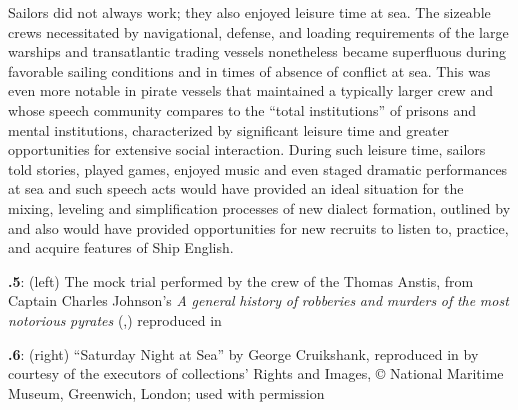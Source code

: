 Sailors did not always work; they also enjoyed leisure time at sea. The sizeable crews necessitated by navigational, defense, and loading requirements of the large warships and transatlantic trading vessels nonetheless became superfluous during favorable sailing conditions and in times of absence of conflict at sea. This was even more notable in pirate vessels that maintained a typically larger crew and whose speech community \citet{Burg2001} compares to the “total institutions” of prisons and mental institutions, characterized by significant leisure time and greater opportunities for extensive social interaction. During such leisure time, sailors told stories, played games, enjoyed music and even staged dramatic performances at sea \citep[155]{Rediker2004} and such speech acts would have provided an ideal situation for the mixing, leveling and simplification processes of new dialect formation, outlined by \citet{Trudgill1986} and also would have provided opportunities for new recruits to listen to, practice, and acquire features of Ship English.

  
 

 

\textbf{.5}: (left) The mock trial performed by the crew of the Thomas Anstis, from Captain Charles Johnson’s \textit{A} \textit{general} \textit{history} \textit{of} \textit{robberies} \textit{and} \textit{murders} \textit{of} \textit{the} \textit{most} \textit{notorious} \textit{pyrates} (\citealt{London1724},) reproduced in \citet[156]{Rediker2004} 

\textbf{.6}: (right) “Saturday Night at Sea” by George Cruikshank, reproduced in \citet[29,]{Dibdin1841} by courtesy of the executors of collections’ Rights and Images, © National Maritime Museum, Greenwich, London; used with permission


